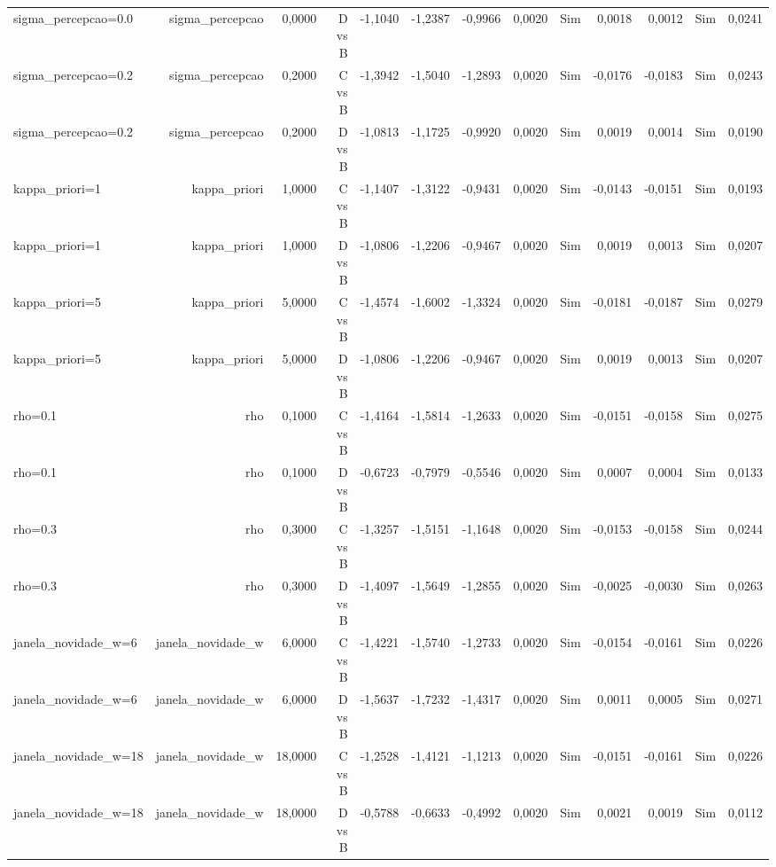 \begin{table}[ht]
\begin{tabular}{lrrrrrrrrrrrr}
sigma\_percepcao=0.0 & sigma\_percepcao & 0,0000 & D vs B & -1,1040 & -1,2387 & -0,9966 & 0,0020 & Sim & 0,0018 & 0,0012 & Sim & 0,0241 \\
sigma\_percepcao=0.2 & sigma\_percepcao & 0,2000 & C vs B & -1,3942 & -1,5040 & -1,2893 & 0,0020 & Sim & -0,0176 & -0,0183 & Sim & 0,0243 \\
sigma\_percepcao=0.2 & sigma\_percepcao & 0,2000 & D vs B & -1,0813 & -1,1725 & -0,9920 & 0,0020 & Sim & 0,0019 & 0,0014 & Sim & 0,0190 \\
kappa\_priori=1 & kappa\_priori & 1,0000 & C vs B & -1,1407 & -1,3122 & -0,9431 & 0,0020 & Sim & -0,0143 & -0,0151 & Sim & 0,0193 \\
kappa\_priori=1 & kappa\_priori & 1,0000 & D vs B & -1,0806 & -1,2206 & -0,9467 & 0,0020 & Sim & 0,0019 & 0,0013 & Sim & 0,0207 \\
kappa\_priori=5 & kappa\_priori & 5,0000 & C vs B & -1,4574 & -1,6002 & -1,3324 & 0,0020 & Sim & -0,0181 & -0,0187 & Sim & 0,0279 \\
kappa\_priori=5 & kappa\_priori & 5,0000 & D vs B & -1,0806 & -1,2206 & -0,9467 & 0,0020 & Sim & 0,0019 & 0,0013 & Sim & 0,0207 \\
rho=0.1 & rho & 0,1000 & C vs B & -1,4164 & -1,5814 & -1,2633 & 0,0020 & Sim & -0,0151 & -0,0158 & Sim & 0,0275 \\
rho=0.1 & rho & 0,1000 & D vs B & -0,6723 & -0,7979 & -0,5546 & 0,0020 & Sim & 0,0007 & 0,0004 & Sim & 0,0133 \\
rho=0.3 & rho & 0,3000 & C vs B & -1,3257 & -1,5151 & -1,1648 & 0,0020 & Sim & -0,0153 & -0,0158 & Sim & 0,0244 \\
rho=0.3 & rho & 0,3000 & D vs B & -1,4097 & -1,5649 & -1,2855 & 0,0020 & Sim & -0,0025 & -0,0030 & Sim & 0,0263 \\
janela\_novidade\_w=6 & janela\_novidade\_w & 6,0000 & C vs B & -1,4221 & -1,5740 & -1,2733 & 0,0020 & Sim & -0,0154 & -0,0161 & Sim & 0,0226 \\
janela\_novidade\_w=6 & janela\_novidade\_w & 6,0000 & D vs B & -1,5637 & -1,7232 & -1,4317 & 0,0020 & Sim & 0,0011 & 0,0005 & Sim & 0,0271 \\
janela\_novidade\_w=18 & janela\_novidade\_w & 18,0000 & C vs B & -1,2528 & -1,4121 & -1,1213 & 0,0020 & Sim & -0,0151 & -0,0161 & Sim & 0,0226 \\
janela\_novidade\_w=18 & janela\_novidade\_w & 18,0000 & D vs B & -0,5788 & -0,6633 & -0,4992 & 0,0020 & Sim & 0,0021 & 0,0019 & Sim & 0,0112 \\
\hline
\end{tabular}
\end{table}

